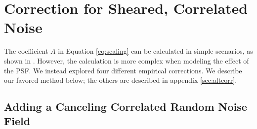 \documentclass[usegraphicx,usenatbib]{mn2e}
\newcommand{\mcalR}{$R$}
\begin{document}
\section{Correction for Sheared, Correlated Noise} \label{sec:corr}

The coefficient $A$ in Equation \ref{eq:scaling} can be calculated in simple
scenarios, as shown in \cite{HirataCorrNoise}.  However, the calculation is
more complex when modeling the effect of the PSF.  We instead explored four
different empirical corrections.  We describe our favored method
below; the others are described in appendix \ref{sec:altcorr}.

\subsection{Adding a Canceling Correlated Random Noise Field} \label{sec:fixnoise}
\end{document}
